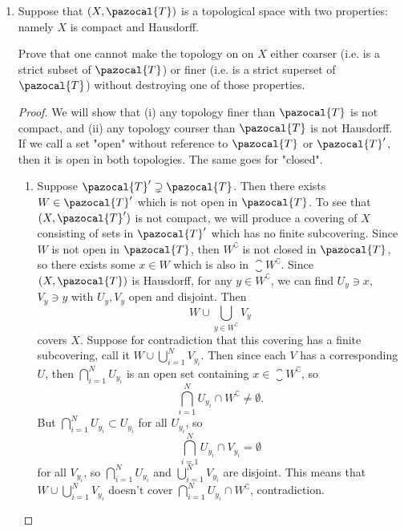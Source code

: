 \documentclass[12pt,letterpaper]{article}
\renewcommand{\T}{\pazocal{T}}
\begin{document}
\begin{enumerate}
\begin{proof}
\begin{itemize}
	\item $\pi$ is an open map, since any open set in $\{x\}\times Y$ is of the form $U\times V \cap \{x\}\times Y = \{x\}\times V$, where $U\in\pazocal{T}_X, V\in \pazocal{T}_Y$. Then 
	$$\pi\left(\{x\}\times V\right)=V,$$
	Which is open in $Y$. 
	\end{itemize}
Thus $\iota$ is a continuous bijection with continuous inverse, and therefore a homeomorphism. 
\end{proof}

\pagebreak
\item Suppose that $(X,\pazocal{T})$ is a topological space with two properties: namely $X$ is compact and Hausdorff. 

Prove that one cannot make the topology on on $X$ either coarser (i.e. is a strict subset of $\pazocal{T}$) or finer (i.e. is a strict superset of $\pazocal{T}$) without destroying one of those properties. 
\begin{proof}We will show that (i) any topology finer than $\T$ is not compact, and (ii) any topology courser than $\T$ is not Hausdorff. If we call a set "open" without reference to $\T$ or $\T'$, then it is open in both topologies.  The same goes for "closed".
	\begin{enumerate}[label=(\roman*)]
	\item Suppose $\T'\supsetneq\T$. Then there exists $W\in\T'$ which is not open in $\T$. To see that $(X,\T')$ is not compact, we will produce a covering of $X$ consisting of sets in $\T'$ which has no finite subcovering. 
	Since $W$ is not open in $\T$, then $W^\complement$ is not closed in $\T$, so there exists some $x\in W$ which is also in $\closure{W^\complement}$. Since $(X,\T)$ is Hausdorff, for any $y\in W^\complement$, we can find $U_y\ni x$, $V_y\ni y$ with $U_y, V_y$ open and disjoint. Then 
	$$W\cup\bigcup_{y\in W^\complement} V_y$$
	covers $X$. Suppose for contradiction that this covering has a finite subcovering, call it $W\cup\bigcup_{i=1}^NV_{y_i}.$	Then since each $V$ has a corresponding $U$, then $\bigcap_{i=1}^NU_{y_i}$ is an open set containing $x\in\closure{W^\complement}$, so 
	$$\bigcap_{i=1}^NU_{y_i}\cap W^\complement\neq\emptyset.$$
	But $\bigcap_{i=1}^NU_{y_i}\subset U_{y_i}$ for all $U_{y_i}$, so
	$$\bigcap_{i=1}^NU_{y_i}\cap V_{y_i}=\emptyset$$ 
	for all $V_{y_i}$, so $\bigcap_{i=1}^NU_{y_i}$ and $\bigcup_{i=1}^NV_{y_i}$ are disjoint. This means that $W\cup\bigcup_{i=1}^NV_{y_i}$ doesn't cover $\bigcap_{i=1}^NU_{y_i}\cap W^\complement$, contradiction. 
	

\end{enumerate}
\end{proof}
\end{enumerate}
\end{document}
